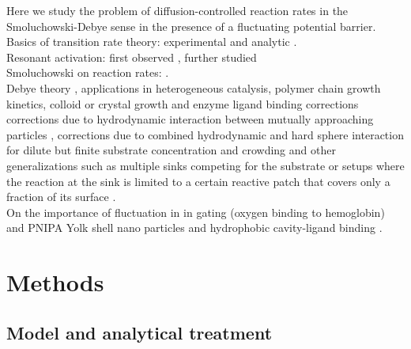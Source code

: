 \documentclass[preprint,superscriptaddress]{revtex4-1}
\begin{document}
Here we study the problem of diffusion-controlled reaction rates in the Smoluchowski-Debye sense \cite{Smoluchowski1917a, Debye1942} in the presence of a fluctuating potential barrier. \\
Basics of transition rate theory: experimental\cite{hoff1884, arrhenius1889} and analytic \cite{Kramers1940}. \\
Resonant activation: first observed \cite{Doering1992}, further studied \cite{Zurcher1993, Pechukas1994, Reimann1995, Reimann1995a} \\
Smoluchowski on reaction rates: \cite{Smoluchowski1916, Smoluchowski1917a}. \\
Debye theory \cite{Debye1942}, applications in heterogeneous catalysis, polymer chain growth kinetics, colloid or crystal growth and enzyme ligand binding \cite{hawker2001new, hansen2002robust, aizenberg1999control, achilias1992development, wisanrakkit1990glass, berg1985diffusion, kuo1974studies, richter1974, alberty1958, Wu2012a} corrections corrections due to hydrodynamic interaction between mutually approaching particles \cite{Friedman1966, Wolyes1976}, corrections due to combined hydrodynamic and hard sphere interaction for dilute but finite substrate concentration \cite{Dzubiella2005} and crowding \cite{Dorsaz2010} and other generalizations such as multiple sinks competing for the substrate \cite{Reck1968a, Reck1968b} or setups where the reaction at the sink is limited to a certain reactive patch that covers only a fraction of its surface \cite{schmitz1972role, schurr1976, shoup1981diffusion, shoup1982role}. \\
On the importance of fluctuation in in gating (oxygen binding to hemoglobin)~\cite{perutz1966x, muirhead1967structure, Szabo1978, Szabo1982} 
and PNIPA Yolk shell nano particles \cite{Wu2012a} and hydrophobic cavity-ligand binding \cite{Setny2013, Mondal2013}. \\

\section{Methods} 

\subsection{Model and analytical treatment}
\end{document}
